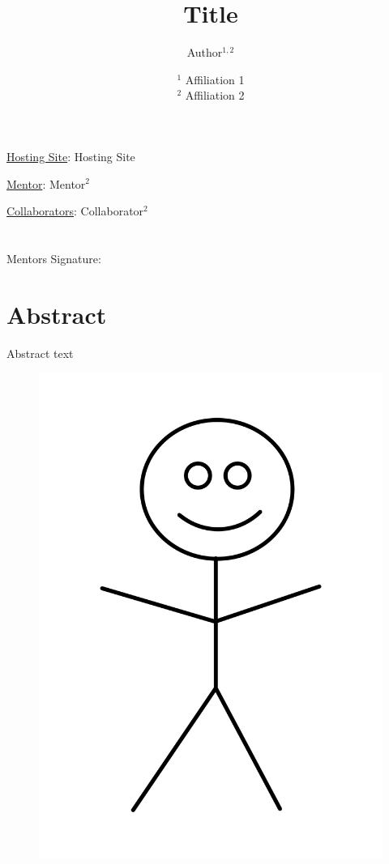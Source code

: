 \documentclass[12pt]{article}
\title{Title}
\author{Author$^{1,2}$ }
\date{%
    $^1$ Affiliation 1\\
    $^2$ Affiliation 2
}
\begin{document}
\maketitle

\section*{ }

\noindent
\large{\underline{Hosting Site}: Hosting Site }

\noindent
\large{\underline{Mentor}: Mentor$^2$}

\noindent
\large{\underline{Collaborators}: Collaborator$^2$}

\section*{ }


\large{Mentors Signature}: \hline

\newpage
\section*{Abstract}
Abstract text

\begin{figure}[H]
    \centering
    \includegraphics[scale=0.2]{portrait.png}
\end{figure}
\end{document}

